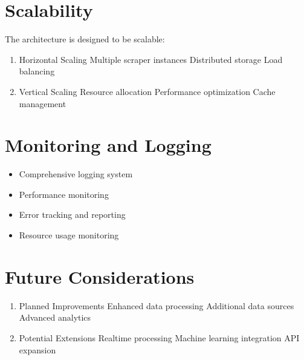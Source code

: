 \documentclass[letterpaper,10pt,english]{sphinxmanual}
\begin{document}
\section{Scalability}
\label{\detokenize{architecture:scalability}}
\sphinxAtStartPar
The architecture is designed to be scalable:
\begin{enumerate}
%
\item {} 
\sphinxAtStartPar
Horizontal Scaling
\sphinxhyphen{} Multiple scraper instances
\sphinxhyphen{} Distributed storage
\sphinxhyphen{} Load balancing

\item {} 
\sphinxAtStartPar
Vertical Scaling
\sphinxhyphen{} Resource allocation
\sphinxhyphen{} Performance optimization
\sphinxhyphen{} Cache management

\end{enumerate}


\section{Monitoring and Logging}
\label{\detokenize{architecture:monitoring-and-logging}}\begin{itemize}
\item {} 
\sphinxAtStartPar
Comprehensive logging system

\item {} 
\sphinxAtStartPar
Performance monitoring

\item {} 
\sphinxAtStartPar
Error tracking and reporting

\item {} 
\sphinxAtStartPar
Resource usage monitoring

\end{itemize}


\section{Future Considerations}
\label{\detokenize{architecture:future-considerations}}\begin{enumerate}
%
\item {} 
\sphinxAtStartPar
Planned Improvements
\sphinxhyphen{} Enhanced data processing
\sphinxhyphen{} Additional data sources
\sphinxhyphen{} Advanced analytics

\item {} 
\sphinxAtStartPar
Potential Extensions
\sphinxhyphen{} Real\sphinxhyphen{}time processing
\sphinxhyphen{} Machine learning integration
\sphinxhyphen{} API expansion

\end{enumerate}
\end{document}
